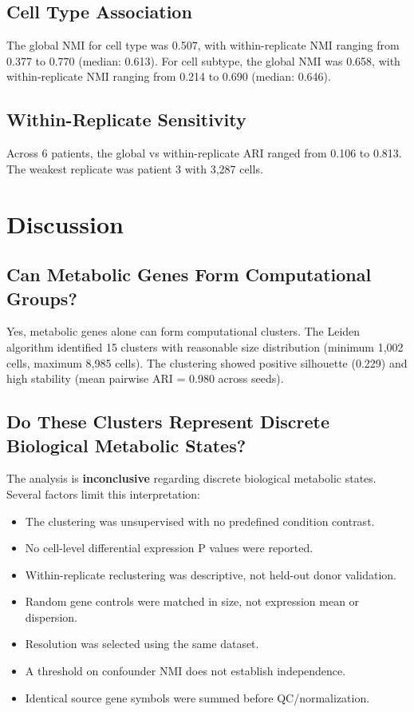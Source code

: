 \documentclass[11pt,a4paper]{article}
\begin{document}
\subsection{Cell Type Association}
The global NMI for cell type was 0.507, with within-replicate NMI ranging from 0.377 to 0.770 (median: 0.613). For cell subtype, the global NMI was 0.658, with within-replicate NMI ranging from 0.214 to 0.690 (median: 0.646).

\subsection{Within-Replicate Sensitivity}
Across 6 patients, the global vs within-replicate ARI ranged from 0.106 to 0.813. The weakest replicate was patient 3 with 3,287 cells.

\section{Discussion}

\subsection{Can Metabolic Genes Form Computational Groups?}
Yes, metabolic genes alone can form computational clusters. The Leiden algorithm identified 15 clusters with reasonable size distribution (minimum 1,002 cells, maximum 8,985 cells). The clustering showed positive silhouette (0.229) and high stability (mean pairwise ARI = 0.980 across seeds).

\subsection{Do These Clusters Represent Discrete Biological Metabolic States?}
The analysis is \textbf{inconclusive} regarding discrete biological metabolic states. Several factors limit this interpretation:

\begin{itemize}
    \item The clustering was unsupervised with no predefined condition contrast.
    \item No cell-level differential expression P values were reported.
    \item Within-replicate reclustering was descriptive, not held-out donor validation.
    \item Random gene controls were matched in size, not expression mean or dispersion.
    \item Resolution was selected using the same dataset.
    \item A threshold on confounder NMI does not establish independence.
    \item Identical source gene symbols were summed before QC/normalization.
\end{itemize}
\end{document}
